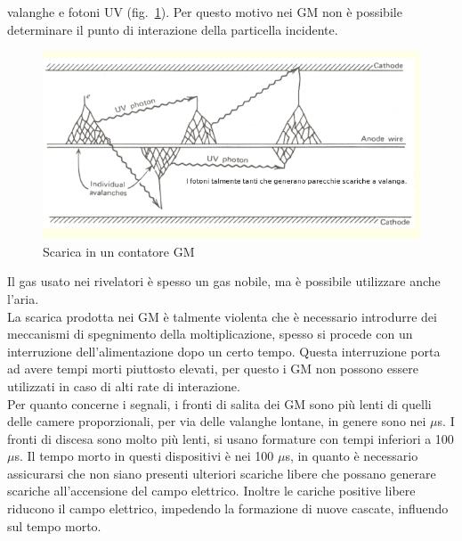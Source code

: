 valanghe e fotoni UV (fig.~\ref{fig:valangaGM}).
Per questo motivo nei GM non \`e possibile determinare il punto di interazione della particella incidente.
\begin{figure}[htbp]
\begin{center}
\includegraphics[scale=0.7]{./Immagini/ValangaGM.png}
\caption{Scarica in un contatore GM}
\label{fig:valangaGM}
\end{center}
\end{figure}
Il gas usato nei rivelatori \`e spesso un gas nobile, ma \`e possibile utilizzare anche l'aria.\\
La scarica prodotta nei GM \`e talmente violenta che \`e necessario introdurre dei meccanismi di spegnimento della moltiplicazione,
spesso si procede con un interruzione dell'alimentazione dopo un certo tempo. 
Questa interruzione porta ad avere tempi morti piuttosto elevati, per questo i GM non possono essere utilizzati in caso di alti rate di interazione.\\
Per quanto concerne i segnali, i fronti di salita dei GM sono pi\`u lenti di quelli delle camere proporzionali, per via delle valanghe lontane,
in genere sono nei $\mu$s. 
I fronti di discesa sono molto pi\`u lenti, si usano formature con tempi inferiori a 100 $\mu$s.
Il tempo morto in questi dispositivi \`e nei 100 $\mu$s, in quanto \`e necessario assicurarsi che non siano presenti ulteriori scariche libere
che possano generare scariche all'accensione del campo elettrico.
Inoltre le cariche positive libere riducono il campo elettrico, impedendo la formazione di nuove cascate, influendo sul tempo morto.